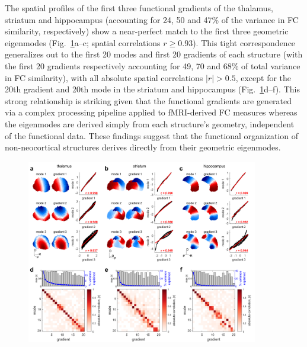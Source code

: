 \documentclass[sn-mathphys-num]{sn-jnl}%
\theoremstyle{thmstyleone}%
\theoremstyle{thmstyletwo}%
\theoremstyle{thmstylethree}%
\begin{document}
The spatial profiles of the first three functional gradients of the thalamus, striatum and hippocampus (accounting for 24, 50 and 47\% of the variance in FC similarity, respectively) show a near-perfect match to the first three geometric eigenmodes (Fig.~\ref{fig:5}a–c; spatial correlations $ r\geq0.93 $). 
This tight correspondence generalizes out to the first 20 modes and first 20 gradients of each structure (with the first 20 gradients respectively accounting for 49, 70 and 68\% of total variance in FC similarity), with all absolute spatial correlations $ |r| > 0.5 $, except for the 20th gradient and 20th mode in the striatum and hippocampus (Fig.~\ref{fig:5}d–f). 
This strong relationship is striking given that the functional gradients are generated via a complex processing pipeline applied to fMRI-derived FC measures whereas the eigenmodes are derived simply from each structure’s geometry, independent of the functional data. These findings suggest that the functional organization of non-neocortical structures derives directly from their geometric eigenmodes.


\begin{figure}[!htb]
	\centering
	\includegraphics[width=0.9\textwidth]{fig/fig_5.pdf}
	\caption{
	} \label{fig:5}
\end{figure}
\end{document}
